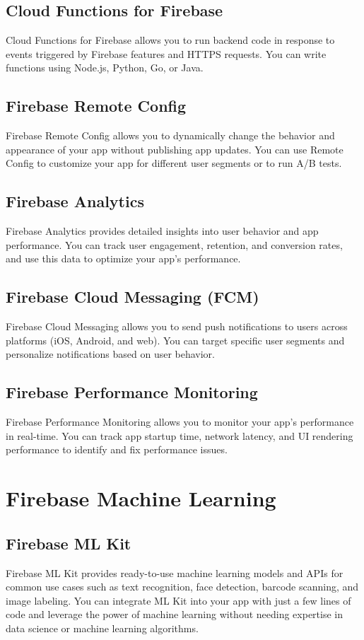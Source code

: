 \documentclass[12pt]{article}
\begin{document}
\subsection{Cloud Functions for Firebase}
Cloud Functions for Firebase allows you to run backend code in response to events triggered by Firebase features and HTTPS requests. You can write functions using Node.js, Python, Go, or Java.

\subsection{Firebase Remote Config}
Firebase Remote Config allows you to dynamically change the behavior and appearance of your app without publishing app updates. You can use Remote Config to customize your app for different user segments or to run A/B tests.

\subsection{Firebase Analytics}
Firebase Analytics provides detailed insights into user behavior and app performance. You can track user engagement, retention, and conversion rates, and use this data to optimize your app's performance.

\subsection{Firebase Cloud Messaging (FCM)}
Firebase Cloud Messaging allows you to send push notifications to users across platforms (iOS, Android, and web). You can target specific user segments and personalize notifications based on user behavior.

\subsection{Firebase Performance Monitoring}
Firebase Performance Monitoring allows you to monitor your app's performance in real-time. You can track app startup time, network latency, and UI rendering performance to identify and fix performance issues.

\section{Firebase Machine Learning}

\subsection{Firebase ML Kit}
Firebase ML Kit provides ready-to-use machine learning models and APIs for common use cases such as text recognition, face detection, barcode scanning, and image labeling. You can integrate ML Kit into your app with just a few lines of code and leverage the power of machine learning without needing expertise in data science or machine learning algorithms.
\end{document}
